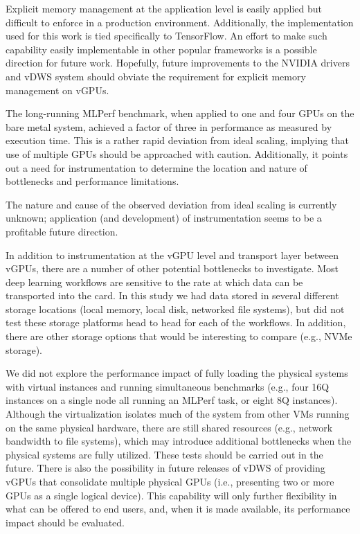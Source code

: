 \documentclass[acmtog, authorversion]{acmart}
\begin{document}
Explicit memory management at the application level is easily applied but difficult to enforce in a production environment. Additionally, the implementation used for this work is tied specifically to TensorFlow. An effort to make such capability easily implementable in other popular frameworks is a possible direction for future work. Hopefully, future improvements to the NVIDIA drivers and vDWS system should obviate the requirement for explicit memory management on vGPUs. 

The long-running MLPerf benchmark, when applied to one and four GPUs on the bare metal system, achieved a factor of three in performance as measured by execution time.
This is a rather rapid deviation from ideal scaling, implying that use of multiple GPUs should be approached with caution. Additionally, it points out a need for instrumentation to determine the location and nature of bottlenecks and performance limitations.

The nature and cause of the observed deviation from ideal scaling is currently unknown; application (and development) of instrumentation seems to be a profitable future direction.

In addition to instrumentation at the vGPU level and transport layer between vGPUs, there are a number of other potential bottlenecks to investigate. Most deep learning workflows are sensitive to the rate at which data can be transported into the card. In this study we had data stored in several different storage locations (local memory, local disk, networked file systems), but did not test these storage platforms head to head for each of the workflows. In addition, there are other storage options that would be interesting to compare (e.g., NVMe storage).

We did not explore the performance impact of fully loading the physical systems with virtual instances and running simultaneous benchmarks (e.g., four 16Q instances on a single node all running an MLPerf task, or eight 8Q instances). Although the virtualization isolates much of the system from other VMs running on the same physical hardware, there are still shared resources (e.g., network bandwidth to file systems), which may introduce additional bottlenecks when the physical systems are fully utilized. These tests should be carried out in the future. There is also the possibility in future releases of vDWS of providing vGPUs that consolidate multiple physical GPUs (i.e., presenting two or more GPUs as a single logical device). This capability will only further flexibility in what can be offered to end users, and, when it is made available, its performance impact should be evaluated.
\end{document}
